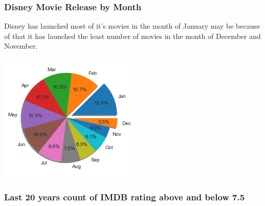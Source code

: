 \documentclass{article}
\begin{document}
\subsubsection{Disney Movie Release by Month }
\noindent
\begin{minipage}{0.55\textwidth}
Disney has launched most of it's movies in the month of January may be because of that it has launched the least number of movies in the month of December and November.
\end{minipage}\hfill%
\begin{minipage}{0.25\textwidth}
\includegraphics[width=\linewidth]{figures/5.png}
\end{minipage}%

\subsubsection{Last 20 years count of IMDB rating above and below 7.5}
\end{document}
